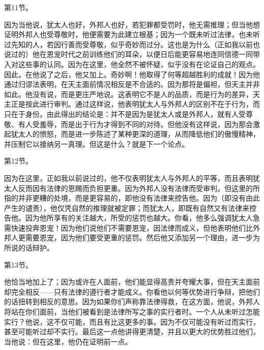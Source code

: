 第11节。\par

因为当他说，犹太人也好，外邦人也好，若犯罪都受罚时，他无需推理；但当他想证明外邦人也受尊敬时，他便需要为此建立根基；因为一个既未听过法律，也未听过先知的人，若因行善而受尊敬，似乎奇妙而过分。这也是为什么（正如我以前也说过的）他在恩宠时代之前训练他们的耳朵，以便日后能更容易地连同信德一同带入对这些事的认同。因为在这里，他全然不被怀疑，似乎没有在论证自己的观点。因此，在他说了之后，他又加上。奇妙啊！他取得了何等超越胜利的成就！因为他通过归谬法表明，在天主面前情况相反是不合适的。因为那将是偏袒，但天主并非如此。他没有说，而是更庄严地说。这表明它不是人的品质，而是行为的差异，天主正是按此进行审判。通过这样说，他表明犹太人与外邦人的区别不在于行为，而只在于身份。由此得出的结论是：并不是因为是犹太人或是外邦人，就有人受尊敬、有人受羞辱，而是出于行为才得到不同的对待。但他没有这样说，因为那会激起犹太人的愤怒，而是进一步陈述了某种更深的道理，从而降低他们的傲慢精神，并压制它以接纳另一真理。但这是什么？就是下一个论点。\par

第12节。\par

因为在这里，正如我以前说过的，他不仅表明犹太人与外邦人的平等，而且表明犹太人反而因有法律的恩赐而负担更重。因为外邦人没有法律而受审判。但这里的所指的并非更糟的处境，而是更容易的，即他没有法律来控告他。因为（即没有由此产生的谴责），他仅凭自然的推理就被定罪；而犹太人，即既有自然又有法律来控告他。因为他所享有的关注越大，所受的惩罚也越大。你看，他多么强调犹太人急需快速投奔恩宠！因为他们说他们不需要恩宠，因法律而成义，但他表明他们比外邦人更需要恩宠，因为他们要受更重的惩罚。然后他又添加另一个理由，进一步为所说的话辩护。\par

第13节。\par

他恰当地加上了；因为或许在人面前，他们能显得高贵并夸耀大事，但在天主面前却完全相反——只有法律的遵行者才能成义。你看他以何等优势进行争辩，把他们的话扭转到相反的意思。因为如果你们声称靠法律得救，在这方面，他说，外邦人将站在你们面前，当他们被看到是法律所写之事的实行者时。一个人从未听过怎能实行？他说，这不仅可能，而且有比这更多的事。因为不仅可能没有听过而实行，甚至可能听过却不实行。最后这一点他讲得更清楚，并且以更大的优势胜过他们，当他说：但在这里，他仍在证明前一点。\par

